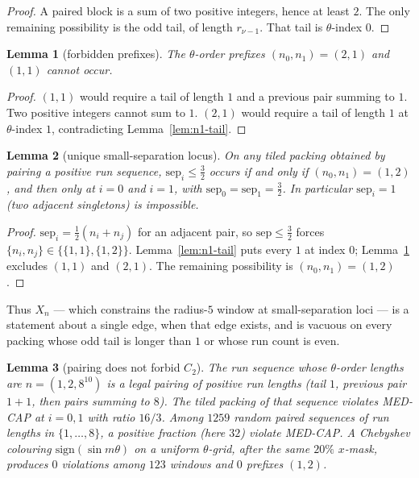 \documentclass[11pt]{article}
\newtheorem{lemma}{Lemma}
\theoremstyle{remark}
\begin{document}
\begin{proof}
A paired block is a sum of two positive integers, hence at least $2$.
The only remaining possibility is the odd tail, of length $r_{\nu-1}$.
That tail is $\theta$-index $0$.
\end{proof}

\begin{lemma}[forbidden prefixes]\label{lem:no-21}
The $\theta$-order prefixes $(n_0,n_1)=(2,1)$ and $(1,1)$ cannot occur.
\end{lemma}

\begin{proof}
$(1,1)$ would require a tail of length $1$ and a previous pair summing
to $1$.  Two positive integers cannot sum to $1$.  $(2,1)$ would
require a tail of length $1$ at $\theta$-index $1$, contradicting
Lemma~\ref{lem:n1-tail}.
\end{proof}

\begin{lemma}[unique small-separation locus]\label{lem:unique-12}
On any tiled packing obtained by pairing a positive run sequence,
$\mathrm{sep}_i\le\tfrac32$ occurs if and only if
$(n_0,n_1)=(1,2)$, and then only at $i=0$ and $i=1$, with
$\mathrm{sep}_0=\mathrm{sep}_1=\tfrac32$.  In particular
$\mathrm{sep}_i=1$ (two adjacent singletons) is impossible.
\end{lemma}

\begin{proof}
$\mathrm{sep}_i=\tfrac12(n_i+n_j)$ for an adjacent pair, so
$\mathrm{sep}\le\tfrac32$ forces $\{n_i,n_j\}\in\{\{1,1\},\{1,2\}\}$.
Lemma~\ref{lem:n1-tail} puts every $1$ at index $0$;
Lemma~\ref{lem:no-21} excludes $(1,1)$ and $(2,1)$.  The remaining
possibility is $(n_0,n_1)=(1,2)$.
\end{proof}

Thus $X_n$ --- which constrains the radius-$5$ window at small-separation
loci --- is a statement about a single edge, when that edge exists, and
is vacuous on every packing whose odd tail is longer than $1$ or whose
run count is even.

\begin{lemma}[pairing does not forbid $C_2$]\label{lem:c2-lives}
The run sequence whose $\theta$-order lengths are
$n=(1,2,8^{10})$ is a legal pairing of positive run lengths
(tail $1$, previous pair $1+1$, then pairs summing to $8$).  The
tiled packing of that sequence violates MED-CAP at $i=0,1$ with
ratio $16/3$.  Among $1259$ random paired sequences of run lengths
in $\{1,\ldots,8\}$, a positive fraction (here $32$) violate
MED-CAP.  A Chebyshev colouring $\mathrm{sign}(\sin m\theta)$ on a
uniform $\theta$-grid, after the same $20\%$ $x$-mask, produces $0$
violations among $123$ windows and $0$ prefixes $(1,2)$.
\end{lemma}
\end{document}
